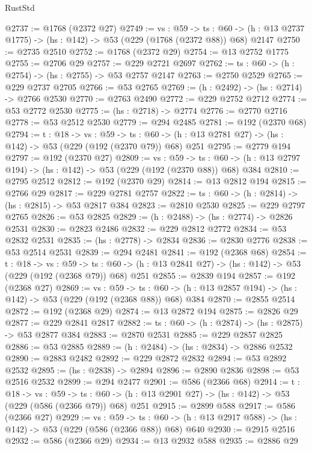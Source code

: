 \begin{lexlean}{RustStd}
\begin{coremodule}
@2737 := @1768 (@2372 @27)
@2749 := {vs : @59} ->
  {ts : @60} -> (h : @13 @2737 @1775) -> (hs : @142) -> @53 (@229 (@1768 (@2372 @88)) @68) @2147
@2750 := @2735 @2510
@2752 := @1768 (@2372 @29)
@2754 := @13 @2752 @1775
@2755 := @2706 @29
@2757 := @229 @2721 @2697
@2762 := {ts : @60} -> (h : @2754) -> (hs : @2755) -> @53 @2757 @2147
@2763 := @2750 @2529
@2765 := @229 @2737 @2705
@2766 := @53 @2765
@2769 := (h : @2492) -> (hs : @2714) -> @2766 @2530
@2770 := @2763 @2490
@2772 := @229 @2752 @2712
@2774 := @53 @2772 @2530
@2775 := (hs : @2718) -> @2774
@2776 := @2770 @2716
@2778 := @53 @2512 @2530
@2779 := @294 @2485
@2781 := @192 (@2370 @68)
@2794 := {t : @18} ->
  {vs : @59} ->
  {ts : @60} -> (h : @13 @2781 @27) -> (hs : @142) -> @53 (@229 (@192 (@2370 @79)) @68) @251
@2795 := @2779 @194
@2797 := @192 (@2370 @27)
@2809 := {vs : @59} ->
  {ts : @60} -> (h : @13 @2797 @194) -> (hs : @142) -> @53 (@229 (@192 (@2370 @88)) @68) @384
@2810 := @2795 @2512
@2812 := @192 (@2370 @29)
@2814 := @13 @2812 @194
@2815 := @2766 @29
@2817 := @229 @2781 @2757
@2822 := {ts : @60} -> (h : @2814) -> (hs : @2815) -> @53 @2817 @384
@2823 := @2810 @2530
@2825 := @229 @2797 @2765
@2826 := @53 @2825
@2829 := (h : @2488) -> (hs : @2774) -> @2826 @2531
@2830 := @2823 @2486
@2832 := @229 @2812 @2772
@2834 := @53 @2832 @2531
@2835 := (hs : @2778) -> @2834
@2836 := @2830 @2776
@2838 := @53 @2514 @2531
@2839 := @294 @2481
@2841 := @192 (@2368 @68)
@2854 := {t : @18} ->
  {vs : @59} ->
  {ts : @60} -> (h : @13 @2841 @27) -> (hs : @142) -> @53 (@229 (@192 (@2368 @79)) @68) @251
@2855 := @2839 @194
@2857 := @192 (@2368 @27)
@2869 := {vs : @59} ->
  {ts : @60} -> (h : @13 @2857 @194) -> (hs : @142) -> @53 (@229 (@192 (@2368 @88)) @68) @384
@2870 := @2855 @2514
@2872 := @192 (@2368 @29)
@2874 := @13 @2872 @194
@2875 := @2826 @29
@2877 := @229 @2841 @2817
@2882 := {ts : @60} -> (h : @2874) -> (hs : @2875) -> @53 @2877 @384
@2883 := @2870 @2531
@2885 := @229 @2857 @2825
@2886 := @53 @2885
@2889 := (h : @2484) -> (hs : @2834) -> @2886 @2532
@2890 := @2883 @2482
@2892 := @229 @2872 @2832
@2894 := @53 @2892 @2532
@2895 := (hs : @2838) -> @2894
@2896 := @2890 @2836
@2898 := @53 @2516 @2532
@2899 := @294 @2477
@2901 := @586 (@2366 @68)
@2914 := {t : @18} ->
  {vs : @59} ->
  {ts : @60} -> (h : @13 @2901 @27) -> (hs : @142) -> @53 (@229 (@586 (@2366 @79)) @68) @251
@2915 := @2899 @588
@2917 := @586 (@2366 @27)
@2929 := {vs : @59} ->
  {ts : @60} -> (h : @13 @2917 @588) -> (hs : @142) -> @53 (@229 (@586 (@2366 @88)) @68) @640
@2930 := @2915 @2516
@2932 := @586 (@2366 @29)
@2934 := @13 @2932 @588
@2935 := @2886 @29

\end{coremodule}
\end{lexlean}

